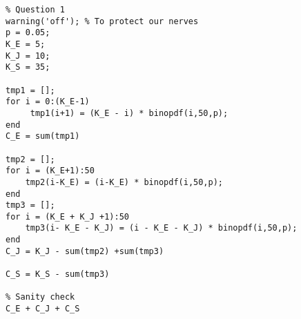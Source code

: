 
\begin{verbatim}
% Question 1
warning('off'); % To protect our nerves
p = 0.05;
K_E = 5;
K_J = 10;
K_S = 35;

tmp1 = [];
for i = 0:(K_E-1)
     tmp1(i+1) = (K_E - i) * binopdf(i,50,p);
end
C_E = sum(tmp1)

tmp2 = [];
for i = (K_E+1):50
    tmp2(i-K_E) = (i-K_E) * binopdf(i,50,p);
end
tmp3 = [];
for i = (K_E + K_J +1):50
    tmp3(i- K_E - K_J) = (i - K_E - K_J) * binopdf(i,50,p);
end
C_J = K_J - sum(tmp2) +sum(tmp3)

C_S = K_S - sum(tmp3)

% Sanity check
C_E + C_J + C_S
\end{verbatim}
